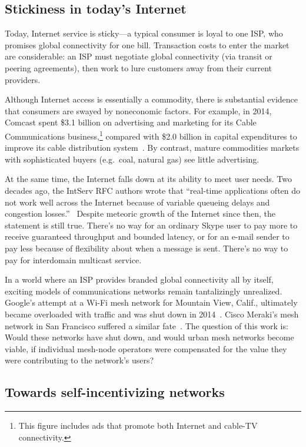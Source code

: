 \subsection{Stickiness in today's Internet}

Today, Internet service is sticky---a typical consumer is loyal to one
ISP, who promises global connectivity for one bill. Transaction costs
to enter the market are considerable: an ISP must negotiate global
connectivity (via transit or peering agreements), then work to lure
customers away from their current providers.

Although Internet access is essentially a commodity, there is
substantial evidence that consumers are swayed by noneconomic
factors. For example, in 2014, Comcast spent \$3.1 billion on advertising and
marketing for its Cable Communications business,\footnote{This figure
  includes ads that promote both Internet and cable-TV connectivity.}
compared with \$2.0 billion in capital expenditures to improve its
cable distribution system~\cite{comcastannualreport}. By contrast,
mature commodities markets with sophisticated buyers (e.g.~coal,
natural gas) see little advertising.

At the same time, the Internet falls down at its ability to meet user
needs. Two decades ago, the IntServ RFC authors wrote that ``real-time
applications often do not work well across the Internet because of
variable queueing delays and congestion losses.''~\cite{rfc1633}
Despite meteoric growth of the Internet since then, the statement is
still true. There's no way for an ordinary Skype user to pay more to receive
guaranteed throughput and bounded latency, or for an e-mail sender to
pay less because of flexibility about when a message is sent. There's no
way to pay for interdomain multicast service.

In a world where an ISP provides branded global connectivity all by
itself, exciting models of communications networks remain
tantalizingly unrealized.  Google's attempt at a Wi-Fi mesh network
for Mountain View, Calif., ultimately became overloaded with traffic
and was shut down in 2014~\cite{pcworld13}. Cisco Meraki's mesh
network in San Francisco suffered a similar fate~\cite{economist14}.
The question of this work is: Would these networks have shut down, and
would urban mesh networks become viable, if individual mesh-node
operators were compensated for the value they were contributing
to the network's users?

\subsection{Towards self-incentivizing networks}

